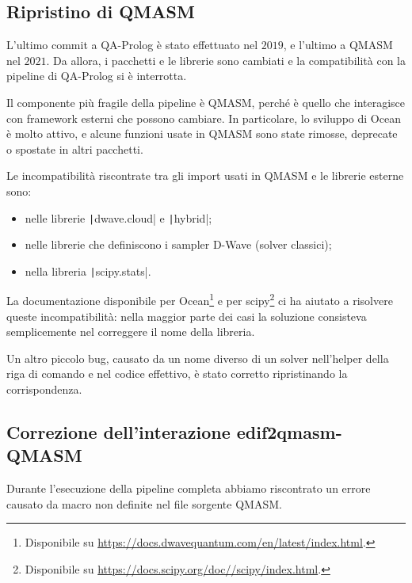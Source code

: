 \subsection{Ripristino di QMASM}
L'ultimo commit a QA-Prolog è stato effettuato nel $2019$, e l'ultimo a QMASM nel $2021$. Da allora, i pacchetti e le librerie sono cambiati e la compatibilità con la pipeline di QA-Prolog si è interrotta.

Il componente più fragile della pipeline è QMASM, perché è quello che interagisce con framework esterni che possono cambiare. In particolare, lo sviluppo di Ocean è molto attivo, e alcune funzioni usate in QMASM sono state rimosse, deprecate o spostate in altri pacchetti.

Le incompatibilità riscontrate tra gli import usati in QMASM e le librerie esterne sono:
\begin{itemize}
	\item nelle librerie \texttt|dwave.cloud| e \texttt|hybrid|;
	\item nelle librerie che definiscono i sampler D-Wave (solver classici);
	\item nella libreria \texttt|scipy.stats|.
\end{itemize}
La documentazione disponibile per Ocean\footnote{Disponibile su \url{https://docs.dwavequantum.com/en/latest/index.html}.} e per scipy\footnote{Disponibile su \url{https://docs.scipy.org/doc//scipy/index.html}.} ci ha aiutato a risolvere queste incompatibilità: nella maggior parte dei casi la soluzione consisteva semplicemente nel correggere il nome della libreria.

Un altro piccolo bug, causato da un nome diverso di un solver nell'helper della riga di comando e nel codice effettivo, è stato corretto ripristinando la corrispondenza.

\subsection{Correzione dell'interazione edif2qmasm-QMASM}
Durante l'esecuzione della pipeline completa abbiamo riscontrato un errore causato da macro non definite nel file sorgente QMASM.

